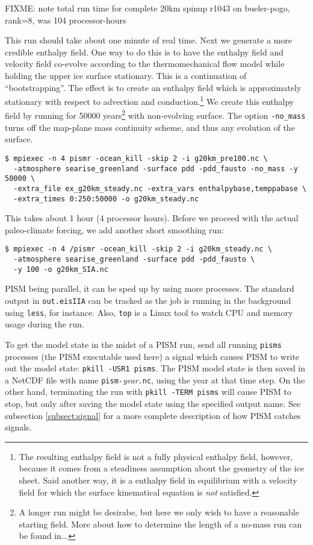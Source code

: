 FIXME:  note total run time for complete 20km spinup r1043 on bueler-pogo, rank=8, was 104 processor-hours

\noindent This run should take about one minute of real time. Next we generate a more credible enthalpy field. One way to do this is to have the enthalpy field and velocity field co-evolve according to the thermomechanical flow model while holding the upper ice surface stationary.  This is a continuation of ``bootstrapping''.  The effect is to create an enthalpy field which is approximately stationary with respect to advection and conduction.\footnote{The resulting enthalpy field is not a fully physical enthalpy field, however, because it comes from a steadiness assumption about the geometry of the ice sheet.  Said another way, it is a enthalpy field in equilibrium with a velocity field for which the surface kinematical equation \cite{Fowler} is \emph{not} satisfied.}  We create this enthalpy field by running for 50000 years\footnote{A longer run might be desirabe, but here we only wish to have a reasonable starting field. More about how to determine the length of a no-mass run can be found in...} with non-evolving surface.  The option \verb|-no_mass| turns off the map-plane mass continuity scheme, and thus any evolution of the surface.
\begin{verbatim}
$ mpiexec -n 4 pismr -ocean_kill -skip 2 -i g20km_pre100.nc \
  -atmosphere searise_greenland -surface pdd -pdd_fausto -no_mass -y 50000 \ 
  -extra_file ex_g20km_steady.nc -extra_vars enthalpybase,temppabase \ 
  -extra_times 0:250:50000 -o g20km_steady.nc
\end{verbatim} This takes about 1 hour (4 processor hours). Before we proceed with the actual paleo-climate forcing, we add another short smoothing run:
\begin{verbatim}
$ mpiexec -n 4 /pismr -ocean_kill -skip 2 -i g20km_steady.nc \
  -atmosphere searise_greenland -surface pdd -pdd_fausto \
  -y 100 -o g20km_SIA.nc
\end{verbatim}







PISM being parallel, it can be sped up by using more processes.  The standard output in \verb|out.eisIIA| can be tracked as the job is running in the background using \verb|less|, for instance.  Also, \verb|top| is a Linux tool to watch CPU and memory usage during the run.


To get the model state in the midst of a PISM run, send all running \verb|pisms| processes (the PISM executable used here) a signal which causes PISM to write out the model state: \verb|pkill -USR1 pisms|.  The PISM model state is then saved in a NetCDF file with name \verb|pism-|\emph{year}\verb|.nc|, using the year at that time step.  On the other hand, terminating the run with \verb|pkill -TERM pisms| will cause PISM to stop, but only after saving the model state using the specified output name.  See subsection \ref{subsect:signal} for a more complete description of how PISM catches signals.

